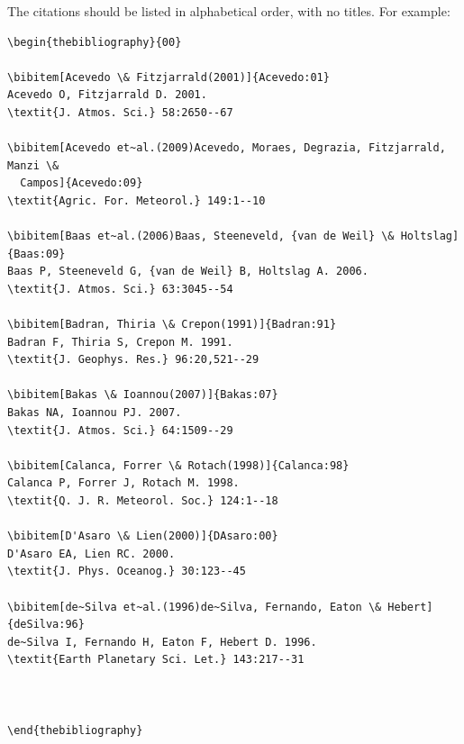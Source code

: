 \documentclass{ar-1col}
\begin{document}
The citations should be listed in alphabetical order, with no titles. For example:






\begin{verbatim}
\begin{thebibliography}{00}

\bibitem[Acevedo \& Fitzjarrald(2001)]{Acevedo:01}
Acevedo O, Fitzjarrald D. 2001.
\textit{J. Atmos. Sci.} 58:2650--67

\bibitem[Acevedo et~al.(2009)Acevedo, Moraes, Degrazia, Fitzjarrald, Manzi \&
  Campos]{Acevedo:09}
\textit{Agric. For. Meteorol.} 149:1--10

\bibitem[Baas et~al.(2006)Baas, Steeneveld, {van de Weil} \& Holtslag]{Baas:09}
Baas P, Steeneveld G, {van de Weil} B, Holtslag A. 2006.
\textit{J. Atmos. Sci.} 63:3045--54

\bibitem[Badran, Thiria \& Crepon(1991)]{Badran:91}
Badran F, Thiria S, Crepon M. 1991.
\textit{J. Geophys. Res.} 96:20,521--29

\bibitem[Bakas \& Ioannou(2007)]{Bakas:07}
Bakas NA, Ioannou PJ. 2007.
\textit{J. Atmos. Sci.} 64:1509--29

\bibitem[Calanca, Forrer \& Rotach(1998)]{Calanca:98}
Calanca P, Forrer J, Rotach M. 1998.
\textit{Q. J. R. Meteorol. Soc.} 124:1--18

\bibitem[D'Asaro \& Lien(2000)]{DAsaro:00}
D'Asaro EA, Lien RC. 2000.
\textit{J. Phys. Oceanog.} 30:123--45

\bibitem[de~Silva et~al.(1996)de~Silva, Fernando, Eaton \& Hebert]{deSilva:96}
de~Silva I, Fernando H, Eaton F, Hebert D. 1996.
\textit{Earth Planetary Sci. Let.} 143:217--31



\end{thebibliography}
\end{verbatim}
\end{document}
